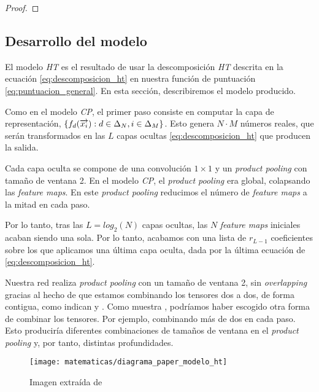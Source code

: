 \begin{proof}


\end{proof}

\subsection{Desarrollo del modelo}

El modelo \textit{HT} es el resultado de usar la descomposición \textit{HT} descrita en la ecuación \eqref{eq:descomposicion_ht} en nuestra función de puntuación \eqref{eq:puntuacion_general}. En esta sección, describiremos el modelo producido.

Como en el modelo \textit{CP}, el primer paso consiste en computar la capa de representación, $\{f_d(\overrightarrow{x_i}): d \in \Delta_{N}, i \in \Delta_{M}\}$. Esto genera $N \cdot M$ números reales, que serán transformados en las $L$ capas ocultas \eqref{eq:descomposicion_ht} que producen la salida.

Cada capa oculta se compone de una convolución $1 \times 1$ y un \textit{product pooling} con tamaño de ventana 2. En el modelo \textit{CP}, el \textit{product pooling} era global, colapsando las \textit{feature maps}. En este \textit{product pooling} reducimos el número de \textit{feature maps} a la mitad en cada paso.

Por lo tanto, tras las $L = log_2(N)$ capas ocultas, las $N$ \textit{feature maps} iniciales acaban siendo una sola. Por lo tanto, acabamos con una lista de $r_{L - 1}$ coeficientes sobre los que aplicamos una última capa oculta, dada por la última ecuación de \eqref{eq:descomposicion_ht}.

Nuestra red realiza \textit{product pooling} con un tamaño de ventana 2, sin \textit{overlapping} gracias al hecho de que estamos combinando los tensores dos a dos, de forma contigua, como indican  y . Como muestra \cite{matematicas:descomposicion_ht}, podríamos haber escogido otra forma de combinar los tensores. Por ejemplo, combinando más de dos en cada paso. Esto produciría diferentes combinaciones de tamaños de ventana en el \textit{product pooling} y, por tanto, distintas profundidades.

\begin{figure}[H]
    \centering
    \texttt{[image: matematicas/diagrama\_paper\_modelo\_ht]}
    \caption{Imagen extraída de \cite{matematicas:principal}}
\end{figure}

